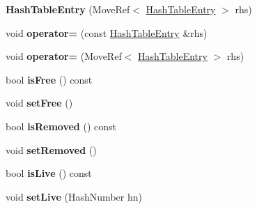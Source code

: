 \begin{DoxyCompactItemize}
\item 
\hypertarget{classjs_1_1detail_1_1_hash_table_entry_a4f9714f12ec963a46e6dc1370fec6767}{{\bfseries Hash\-Table\-Entry} (Move\-Ref$<$ \hyperlink{classjs_1_1detail_1_1_hash_table_entry}{Hash\-Table\-Entry} $>$ rhs)}\label{classjs_1_1detail_1_1_hash_table_entry_a4f9714f12ec963a46e6dc1370fec6767}

\item 
\hypertarget{classjs_1_1detail_1_1_hash_table_entry_a6e4ca7beb36f40063b4e74744ebac63b}{void {\bfseries operator=} (const \hyperlink{classjs_1_1detail_1_1_hash_table_entry}{Hash\-Table\-Entry} \&rhs)}\label{classjs_1_1detail_1_1_hash_table_entry_a6e4ca7beb36f40063b4e74744ebac63b}

\item 
\hypertarget{classjs_1_1detail_1_1_hash_table_entry_a093320407233e1e0d2842a91733020b4}{void {\bfseries operator=} (Move\-Ref$<$ \hyperlink{classjs_1_1detail_1_1_hash_table_entry}{Hash\-Table\-Entry} $>$ rhs)}\label{classjs_1_1detail_1_1_hash_table_entry_a093320407233e1e0d2842a91733020b4}

\item 
\hypertarget{classjs_1_1detail_1_1_hash_table_entry_a8e8d24f664a2968f5b275b6d316ebea9}{bool {\bfseries is\-Free} () const }\label{classjs_1_1detail_1_1_hash_table_entry_a8e8d24f664a2968f5b275b6d316ebea9}

\item 
\hypertarget{classjs_1_1detail_1_1_hash_table_entry_a55ae904f319921388d7b454330d4a220}{void {\bfseries set\-Free} ()}\label{classjs_1_1detail_1_1_hash_table_entry_a55ae904f319921388d7b454330d4a220}

\item 
\hypertarget{classjs_1_1detail_1_1_hash_table_entry_a281e1920be39b5127f4248515ae64269}{bool {\bfseries is\-Removed} () const }\label{classjs_1_1detail_1_1_hash_table_entry_a281e1920be39b5127f4248515ae64269}

\item 
\hypertarget{classjs_1_1detail_1_1_hash_table_entry_a9f3b32cae217ee7d765fd672963b7679}{void {\bfseries set\-Removed} ()}\label{classjs_1_1detail_1_1_hash_table_entry_a9f3b32cae217ee7d765fd672963b7679}

\item 
\hypertarget{classjs_1_1detail_1_1_hash_table_entry_ae033c8e6bbb61f8e4f27e9211d3d569f}{bool {\bfseries is\-Live} () const }\label{classjs_1_1detail_1_1_hash_table_entry_ae033c8e6bbb61f8e4f27e9211d3d569f}

\item 
\hypertarget{classjs_1_1detail_1_1_hash_table_entry_ae58d83fd4715e1a2b6567f1f758bfb5b}{void {\bfseries set\-Live} (Hash\-Number hn)}\label{classjs_1_1detail_1_1_hash_table_entry_ae58d83fd4715e1a2b6567f1f758bfb5b}


\end{DoxyCompactItemize}
